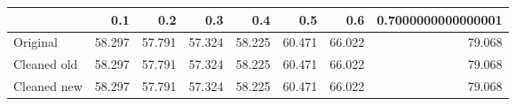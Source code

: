 \begin{tabular}{lrrrrrrr}
\toprule
{} &    0.1 &    0.2 &    0.3 &    0.4 &    0.5 &    0.6 & 0.7000000000000001 \\
\midrule
Original    & 58.297 & 57.791 & 57.324 & 58.225 & 60.471 & 66.022 &             79.068 \\
Cleaned old & 58.297 & 57.791 & 57.324 & 58.225 & 60.471 & 66.022 &             79.068 \\
Cleaned new & 58.297 & 57.791 & 57.324 & 58.225 & 60.471 & 66.022 &             79.068 \\
\bottomrule
\end{tabular}
